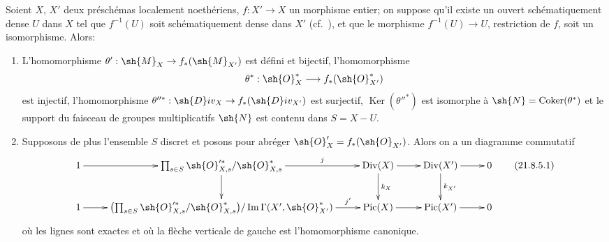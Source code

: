 \begin{proposition}[21.8.5]
\label{IV.21.8.5}
Soient $X$, $X'$ deux préschémas localement noethériens, $f:X'\to X$ un morphisme entier;
on suppose qu'il existe un ouvert schématiquement dense $U$ dans $X$ tel que $f^{-1}(U)$ soit schématiquement dense dans $X'$ (cf.\ ), et que le morphisme $f^{-1}(U)\to U$, restriction de $f$, soit un isomorphisme.
Alors:
\begin{enumerate}[label=(\roman*)]
  \item L'homomorphisme $\theta':\sh{M}_X\to f_*(\sh{M}_{X'})$ est défini et bijectif, l'homomorphisme
\[
  \theta^*:\sh{O}^*_X\to f_*(\sh{O}^*_{X'})
\]
est injectif, l'homomorphisme $\theta''^*:\sh{D}iv_X\to f_*(\sh{D}iv_{X'})$ est surjectif, $\operatorname{Ker}(\theta''^*)$ est isomorphe à $\sh{N}=\operatorname{Coker}(\theta^*)$ et le support du faisceau de groupes multiplicatifs $\sh{N}$ est contenu dans $S=X-U$.
  \item Supposons de plus l'ensemble $S$ discret et posons pour abréger $\sh{O}'_X=f_*(\sh{O}_{X'})$.
Alors on a un diagramme commutatif
\[
\label{IV.21.8.5.1}
  \xymatrix{
    1 \ar[r] & \prod_{s\in S}\sh{O}'^{*}_{X,s}/\sh{O}^*_{X,s} \ar[r]^-{j} \ar[d] & \operatorname{Div}(X) \ar[r] \ar[d]^{k_X} & \operatorname{Div}(X') \ar[r] \ar[d]^{k_{X'}} & 0\\
    1 \ar[r] & \bigl(\prod_{s\in S}\sh{O}'^{*}_{X,s}/\sh{O}^*_{X,s}\bigr)/\operatorname{Im}\Gamma(X',\sh{O}^*_{X'}) \ar[r]^-{j'} & \operatorname{Pic}(X) \ar[r] & \operatorname{Pic}(X') \ar[r] & 0
  }
  \tag{21.8.5.1}
\]
où les lignes sont exactes et où la flèche verticale de gauche est l'homomorphisme canonique.
\end{enumerate}
\end{proposition}


